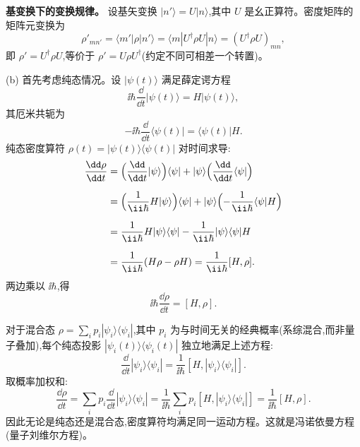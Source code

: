 \begin{solution}
\textbf{基变换下的变换规律。}
设基矢变换 $|n'\rangle = U|n\rangle$,其中 $U$ 是幺正算符。密度矩阵的矩阵元变换为
\[
\rho'_{mn'} = \langle m'|\rho|n'\rangle = \langle m|U^\dagger\rho U|n\rangle = (U^\dagger\rho U)_{mn},
\]
即 $\rho' = U^\dagger\rho U$,等价于 $\rho' = U\rho U^\dagger$(约定不同可相差一个转置)。

(b) 首先考虑纯态情况。设 $|\psi(t)\rangle$ 满足薛定谔方程
\[
\ii\hbar\frac{\dd}{\dd t}|\psi(t)\rangle = H|\psi(t)\rangle,
\]
其厄米共轭为
\[
-\ii\hbar\frac{\dd}{\dd t}\langle\psi(t)| = \langle\psi(t)|H.
\]
纯态密度算符 $\rho(t)=|\psi(t)\rangle\langle\psi(t)|$ 对时间求导:
\[
\begin{aligned}
\frac{\dd\rho}{\dd t}
&= \Bigl(\frac{\dd}{\dd t}|\psi\rangle\Bigr)\langle\psi| + |\psi\rangle\Bigl(\frac{\dd}{\dd t}\langle\psi|\Bigr)\\[2mm]
&= \Bigl(\frac{1}{\ii\hbar}H|\psi\rangle\Bigr)\langle\psi| + |\psi\rangle\Bigl(-\frac{1}{\ii\hbar}\langle\psi|H\Bigr)\\[2mm]
&= \frac{1}{\ii\hbar} H|\psi\rangle\langle\psi| - \frac{1}{\ii\hbar} |\psi\rangle\langle\psi|H \\[2mm]
&= \frac{1}{\ii\hbar}(H\rho - \rho H) = \frac{1}{\ii\hbar}[H,\rho].
\end{aligned}
\]
两边乘以 $\ii\hbar$,得
\[
\boxed{\ii\hbar\frac{\dd\rho}{\dd t} = [H,\rho].}
\]

对于混合态 $\rho = \sum_i p_i |\psi_i\rangle\langle\psi_i|$,其中 $p_i$ 为与时间无关的经典概率(系综混合,而非量子叠加),每个纯态投影 $|\psi_i(t)\rangle\langle\psi_i(t)|$ 独立地满足上述方程:
\[
\frac{\dd}{\dd t}|\psi_i\rangle\langle\psi_i| = \frac{1}{\ii\hbar}[H,|\psi_i\rangle\langle\psi_i|].
\]
取概率加权和:
\[
\frac{\dd\rho}{\dd t} = \sum_i p_i\frac{\dd}{\dd t}|\psi_i\rangle\langle\psi_i|
= \frac{1}{\ii\hbar}\sum_i p_i [H,|\psi_i\rangle\langle\psi_i|]
= \frac{1}{\ii\hbar}[H,\rho].
\]
因此无论是纯态还是混合态,密度算符均满足同一运动方程。这就是冯诺依曼方程(量子刘维尔方程)。
\end{solution}

